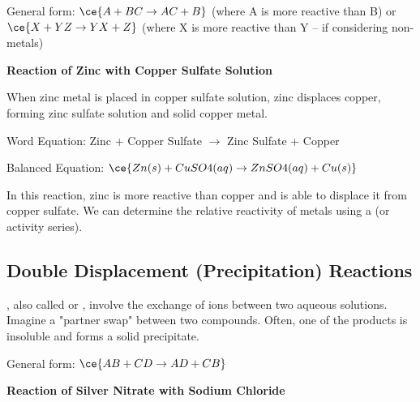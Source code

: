 {General form: $\ce{A + BC \rightarrow AC + B}$  (where A is more reactive than B)  or $\ce{X + YZ \rightarrow YX + Z}$ (where X is more reactive than Y – if considering non-metals)

\begin{example}
\textbf{Reaction of Zinc with Copper Sulfate Solution}

When zinc metal is placed in copper sulfate solution, zinc displaces copper, forming zinc sulfate solution and solid copper metal.

Word Equation: Zinc + Copper Sulfate $\rightarrow$ Zinc Sulfate + Copper

Balanced Equation: $\ce{Zn(s) + CuSO4(aq) \rightarrow ZnSO4(aq) + Cu(s)}$

In this reaction, zinc is more reactive than copper and is able to displace it from copper sulfate. We can determine the relative reactivity of metals using a  (or activity series).
\end{example}


\subsection{Double Displacement (Precipitation) Reactions}


, also called  or , involve the exchange of ions between two aqueous solutions.  Imagine a "partner swap" between two compounds. Often, one of the products is insoluble and forms a solid precipitate.

General form: $\ce{AB + CD \rightarrow AD + CB}$

\begin{example}
\textbf{Reaction of Silver Nitrate with Sodium Chloride}


\end{example}}
